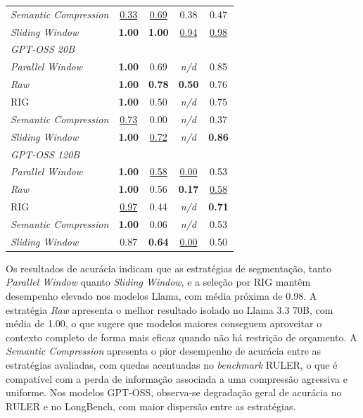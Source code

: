 \begin{table}[htbp]
\begin{tabular}{lccc|c}
\textit{Semantic Compression} & \underline{0.33} & \underline{0.69} & 0.38             & 0.47 \\
\textit{Sliding Window}       & \textbf{1.00}    & \textbf{1.00}    & \underline{0.94} & \underline{0.98} \\
\midrule
\multicolumn{5}{l}{\textit{GPT-OSS 20B}} \\
\textit{Parallel Window}      & \textbf{1.00}    & 0.69             & \textit{n/d} & 0.85 \\
\textit{Raw}                  & \textbf{1.00}    & \textbf{0.78}    & \textbf{0.50} & 0.76 \\
RIG                           & \textbf{1.00}    & 0.50             & \textit{n/d} & 0.75 \\
\textit{Semantic Compression} & \underline{0.73} & 0.00             & \textit{n/d} & 0.37 \\
\textit{Sliding Window}       & \textbf{1.00}    & \underline{0.72} & \textit{n/d} & \textbf{0.86} \\
\midrule
\multicolumn{5}{l}{\textit{GPT-OSS 120B}} \\
\textit{Parallel Window}      & \textbf{1.00}    & \underline{0.58} & \underline{0.00} & 0.53 \\
\textit{Raw}                  & \textbf{1.00}    & 0.56             & \textbf{0.17}    & \underline{0.58} \\
RIG                           & \underline{0.97} & 0.44             & \textit{n/d}     & \textbf{0.71} \\
\textit{Semantic Compression} & \textbf{1.00}    & 0.06             & \textit{n/d}     & 0.53 \\
\textit{Sliding Window}       & 0.87             & \textbf{0.64}    & \underline{0.00} & 0.50 \\
\bottomrule
\end{tabular}
\end{table}

Os resultados de acurácia indicam que as estratégias de segmentação, tanto \textit{Parallel Window} quanto \textit{Sliding Window}, e a seleção por RIG mantêm desempenho elevado nos modelos Llama, com média próxima de 0.98. A estratégia \textit{Raw} apresenta o melhor resultado isolado no Llama 3.3 70B, com média de 1.00, o que sugere que modelos maiores conseguem aproveitar o contexto completo de forma mais eficaz quando não há restrição de orçamento. A \textit{Semantic Compression} apresenta o pior desempenho de acurácia entre as estratégias avaliadas, com quedas acentuadas no \textit{benchmark} RULER, o que é compatível com a perda de informação associada a uma compressão agressiva e uniforme. Nos modelos GPT-OSS, observa-se degradação geral de acurácia no RULER e no LongBench, com maior dispersão entre as estratégias.

